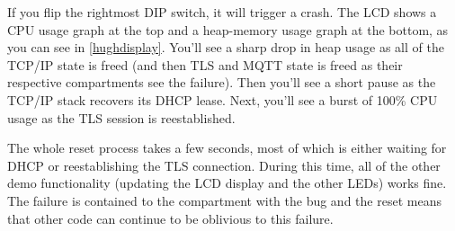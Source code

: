If you flip the rightmost DIP switch, it will trigger a crash.
The LCD shows a CPU usage graph at the top and a heap-memory usage graph at the bottom, as you can see in \ref{hughdisplay}.
You'll see a sharp drop in heap usage as all of the TCP/IP state is freed (and then TLS and MQTT state is freed as their respective compartments see the failure).
Then you'll see a short pause as the TCP/IP stack recovers its DHCP lease.
Next, you'll see a burst of 100\% CPU usage as the TLS session is reestablished.


The whole reset process takes a few seconds, most of which is either waiting for DHCP or reestablishing the TLS connection.
During this time, all of the other demo functionality (updating the LCD display and the other LEDs) works fine.
The failure is contained to the compartment with the bug and the reset means that other code can continue to be oblivious to this failure.
